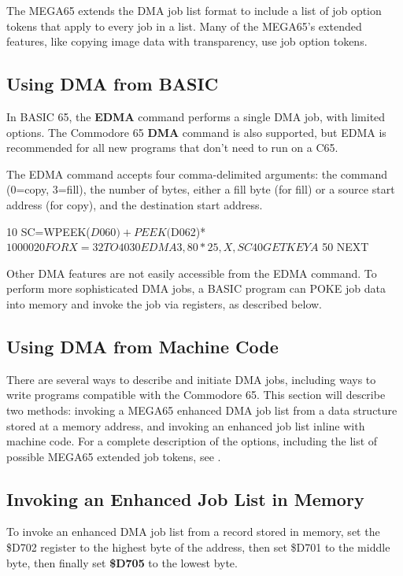 The MEGA65 extends the DMA job list format to include a list of
job option tokens that apply to every job in a list. Many of the MEGA65's
extended features, like copying image data with transparency, use job
option tokens.

\subsection{Using DMA from BASIC}

In BASIC 65, the {\bf EDMA} command performs a single DMA job, with limited
options. The Commodore 65 {\bf DMA} command is also supported, but EDMA is
recommended for all new programs that don't need to run on a C65.

The EDMA command accepts four comma-delimited arguments: the command (0=copy,
3=fill), the number of bytes, either a fill byte (for fill) or a source start
address (for copy), and the destination start address.

\begin{screenoutput}
10 SC=WPEEK($D060)+PEEK($D062)*$10000
20 FOR X=32 TO 40
30 EDMA 3,80*25,X,SC
40 GETKEY A$
50 NEXT
\end{screenoutput}

Other DMA features are not easily accessible from the EDMA command. To perform
more sophisticated DMA jobs, a BASIC program can POKE job data into memory and
invoke the job via registers, as described below.

\subsection{Using DMA from Machine Code}

There are several ways to describe and initiate DMA jobs, including ways to
write programs compatible with the Commodore 65. This section will describe two
methods: invoking a MEGA65 enhanced DMA job list from a data structure
stored at a memory address, and invoking an enhanced job list inline with
machine code. For a complete description of the options, including the list of
possible MEGA65 extended job tokens, see .

\subsection{Invoking an Enhanced Job List in Memory}

To invoke an enhanced DMA job list from a record stored in memory, set the
\$D702 register to the highest byte of the address, then set \$D701
to the middle byte, then finally set {\bf \$D705} to the lowest byte.

